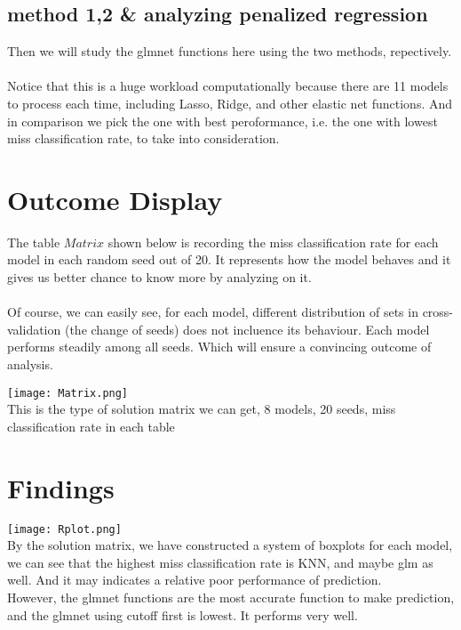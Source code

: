 \documentclass[12pt,letter]{article}
\begin{document}
\subsection{method 1,2 \& analyzing penalized regression}
Then we will study the glmnet functions here using the two methods, repectively.\\
\vspace{1mm}\\
Notice that this is a huge workload computationally because there are 11 models to process each time, including Lasso, Ridge, and other elastic net functions. And in comparison we pick the one with best peroformance, i.e. the one with lowest miss classification rate, to take into consideration.

\section{Outcome Display}
The table $Matrix$ shown below is recording the miss classification rate for each model in each random seed out of 20. It represents how the model behaves and it gives us better chance to know more by analyzing on it.\\
\vspace{1mm}\\
Of course, we can easily see, for each model, different distribution of sets in cross-validation (the change of seeds) does not incluence its behaviour. Each model performs steadily among all seeds. Which will ensure a convincing outcome of analysis.

\texttt{[image: Matrix.png]}\\
This is the type of solution matrix we can get, 8 models, 20 seeds, miss classification rate in each table 

\section{Findings}
\texttt{[image: Rplot.png]}\\
By the solution matrix, we have constructed a system of boxplots for each model, we can see that the highest miss classification rate is KNN, and maybe glm as well. And it may indicates a relative poor performance of prediction.\\
However, the glmnet functions are the most accurate function to make prediction, and the glmnet using cutoff first is lowest. It performs very well.
\end{document}
